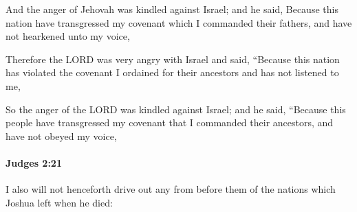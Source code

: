			\begin{versebox}
					\item[BHS] 
					\item[ASV] And the anger of Jehovah was kindled against Israel; and he said, Because this nation have transgressed my covenant which I commanded their fathers, and have not hearkened unto my voice,
					\item[NIV] Therefore the LORD was very angry with Israel and said, “Because this nation has violated the covenant I ordained for their ancestors and has not listened to me,
					\item[NRSV] So the anger of the LORD was kindled against Israel; and he said, “Because this people have transgressed my covenant that I commanded their ancestors, and have not obeyed my voice,
			\end{versebox}

		\paragraph{Judges 2:21} %
			\label{JUDGES-2-21}

			I also will not henceforth drive out any from before them of the nations which Joshua left when he died:

